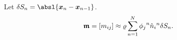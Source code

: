 Let $\delta S_{n} = \absl{\xvec_{n} - \xvec_{n - 1}}$.
\[
    \bm{\mathfrak{m}} = [m_{ij}] \approx \varrho \sum_{n = 1}^{N} {\phi_{j}}^{n} {\hat{n}}_{i}{}^{n} \delta S_{n}.
\]
